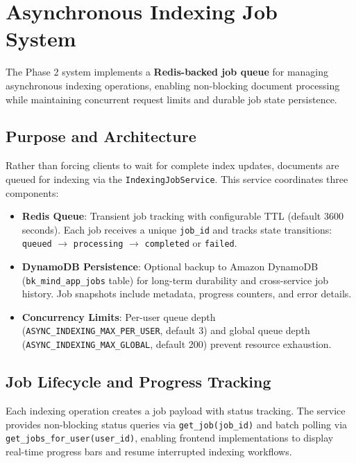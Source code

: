 \section{Asynchronous Indexing Job System}

The Phase 2 system implements a \textbf{Redis-backed job queue} for managing asynchronous indexing operations, enabling non-blocking document processing while maintaining concurrent request limits and durable job state persistence.

\subsection{Purpose and Architecture}

Rather than forcing clients to wait for complete index updates, documents are queued for indexing via the \texttt{IndexingJobService}. This service coordinates three components:

\begin{itemize}
    \item \textbf{Redis Queue}: Transient job tracking with configurable TTL (default 3600 seconds). Each job receives a unique \texttt{job\_id} and tracks state transitions: \texttt{queued} $\rightarrow$ \texttt{processing} $\rightarrow$ \texttt{completed} or \texttt{failed}.

    \item \textbf{DynamoDB Persistence}: Optional backup to Amazon DynamoDB (\texttt{bk\_mind\_app\_jobs} table) for long-term durability and cross-service job history. Job snapshots include metadata, progress counters, and error details.

    \item \textbf{Concurrency Limits}: Per-user queue depth (\texttt{ASYNC\_INDEXING\_MAX\_PER\_USER}, default 3) and global queue depth (\texttt{ASYNC\_INDEXING\_MAX\_GLOBAL}, default 200) prevent resource exhaustion.
\end{itemize}

\subsection{Job Lifecycle and Progress Tracking}

Each indexing operation creates a job payload with status tracking. The service provides non-blocking status queries via \texttt{get\_job(job\_id)} and batch polling via \texttt{get\_jobs\_for\_user(user\_id)}, enabling frontend implementations to display real-time progress bars and resume interrupted indexing workflows.

